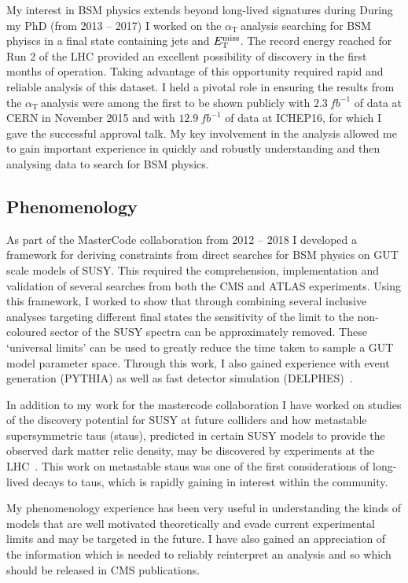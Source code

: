 \documentclass[11pt]{article}
\theoremstyle{plain} \numberwithin{equation}{section}
\theoremstyle{definition}
\DeclareRobustCommand{\alphat}{$\alpha_{\text{T}}~$}
\DeclareRobustCommand{\met}{$\mbox{$E_\text{T}^{\rm miss}$}\xspace$}
\begin{document}
My interest in BSM physics extends beyond long-lived signatures during 
During my PhD (from 2013 -- 2017) I worked on the \alphat analysis searching
for BSM phyiscs in a final state containing jets and \met. 
The record energy reached for Run 2 of the LHC provided an excellent possibility of discovery
in the first months of operation. Taking advantage of this opportunity
required rapid and reliable analysis of this dataset. 
I held a pivotal role in ensuring the results from the \alphat analysis were among the 
first to be shown publicly with $2.3~{fb}^{-1}$ of data at CERN in November 2015
and with $12.9~{fb}^{-1}$ of data at ICHEP16, for which I gave the successful
approval talk. My key involvement in the analysis allowed me to gain important experience 
in quickly and robustly understanding and then analysing data to search for BSM physics. 

\subsection*{Phenomenology}

As part of the MasterCode collaboration from 2012 -- 2018 I developed a framework for 
deriving constraints from direct searches for BSM physics on GUT scale models of SUSY.
This required the comprehension, implementation and validation of several 
searches from both the CMS and ATLAS experiments. Using this framework, I worked to show that through combining several inclusive analyses targeting 
different final states the sensitivity of the limit to the non-coloured sector of the SUSY spectra can be approximately removed. 
These `universal limits' can be used to greatly reduce the time taken to sample a GUT model parameter space. 
Through this work, I also gained experience with event generation (PYTHIA) as well as fast detector simulation (DELPHES)~\cite{XX}.

In addition to my work for the mastercode collaboration I have worked on 
studies of the discovery potential for SUSY at future colliders and how 
metastable supersymmetric taus (staus), predicted in certain SUSY models to provide the observed
dark matter relic density, may be discovered by experiments at the LHC~\cite{XX}. 
This work on metastable staus was one of the first considerations of long-lived decays to taus, which
is rapidly gaining in interest within the community.

My phenomenology experience has been very useful in understanding
the kinds of models that are well motivated theoretically and evade current experimental limits and may be targeted in the 
future. I have also gained an appreciation
of the information which is needed to reliably reinterpret an analysis and so which should be released in CMS publications.
\end{document}
